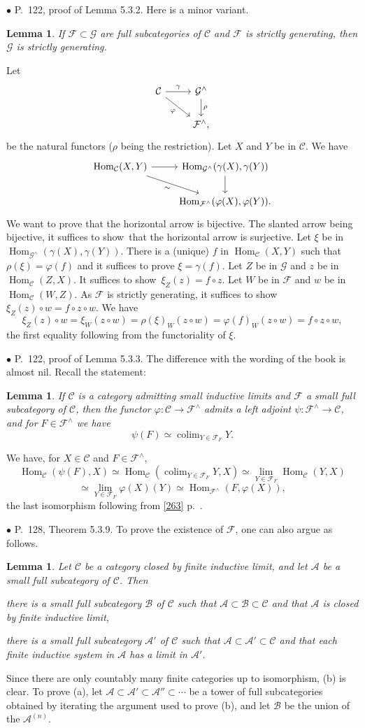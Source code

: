 \documentclass[12pt]{article}
\newtheorem{lem}[thm]{Lemma}
\theoremstyle{remark}%
\newcommand{\bu}{\bullet}
\newcommand{\n}{\noindent}
\newcommand{\A}{\mathcal A}
\newcommand{\B}{\mathcal B}
\newcommand{\C}{\mathcal C}
\newcommand{\F}{\mathcal F}
\newcommand{\G}{\mathcal G}
\newcommand{\p}{\varphi}
\newcommand{\pf}{\n{\em Proof. }}
\newcommand{\bl}{\begin{lem}}
\newcommand{\el}{\end{lem}}
\newcommand{\sts}{t suffices to show}
\DeclareMathOperator*{\co}{colim}
\DeclareMathOperator{\h}{Hom}
\begin{document}

\n$\bu$ P.~122, proof of Lemma 5.3.2. Here is a minor variant. 
%
\bl 
If $\F\subset\G$ are full subcategories of $\C$ and $\F$ is strictly generating, then $\G$ is strictly generating. 
\el 
%
\pf Let 
$$
\begin{tikzcd}
\C\ar{r}{\gamma}\ar{dr}[swap]{\p}&\G^\wedge\ar{d}{\rho}\\
&\F^\wedge,
\end{tikzcd}
$$ 
be the natural functors ($\rho$ being the restriction). Let $X$ and $Y$ be in $\C$. We have 
$$
\begin{tikzcd}
\h_\C(X,Y)\ar{r}\ar{dr}[swap]{\sim}&\h_{\G^\wedge}(\gamma(X),\gamma(Y))\ar{d}\\
&\h_{\F^\wedge}(\p(X),\p(Y)). 
\end{tikzcd}
$$ 
We want to prove that the horizontal arrow is bijective. The slanted arrow being bijective, i\sts\ that the horizontal arrow is surjective. Let $\xi$ be in $\h_{\G^\wedge}(\gamma(X),\gamma(Y))$. There is a (unique) $f$ in $\h_\C(X,Y)$ such that $\rho(\xi)=\p(f)$ and it suffices to prove $\xi=\gamma(f)$. Let $Z$ be in $\G$ and $z$ be in $\h_\C(Z,X)$. I\sts\ $\xi_Z(z)=f\circ z$. Let $W$ be in $\F$ and $w$ be in $\h_\C(W,Z)$. As $\F$ is strictly generating, i\sts\ $\xi_Z(z)\circ w=f\circ z\circ w$. We have 
$$
\xi_Z(z)\circ w=\xi_W(z\circ w)=\rho(\xi)_W(z\circ w)=\p(f)_W(z\circ w)
=f\circ z\circ w, 
$$ 
the first equality following from the functoriality of $\xi$. 


\n$\bu$ P.~122, proof of Lemma 5.3.3. The difference with the wording of the book is almost nil. Recall the statement: 
% 
\bl
If $\C$ is a category admitting small inductive limits and $\F$ a small full subcategory of $\C$, then the functor $\p:\C\to\F^\wedge$ admits a left adjoint $\psi:\F^\wedge\to\C$, and for $F\in\F^\wedge$ we have 
$$
\psi(F)\simeq\co_{Y\in\F_F}Y. 
$$ 
\el 
% 
\pf We have, for $X\in\C$ and $F\in\F^\wedge$, 
$$
\h_\C(\psi(F),X)\simeq\h_\C\left(\co_{Y\in\F_F}Y,X\right)\simeq\lim_{Y\in\F_F}\h_\C(Y,X)
$$ 
$$
\simeq\lim_{Y\in\F_F}\p(X)(Y)\simeq\h_{\F^\wedge}(F,\p(X)),
$$ 
the last isomorphism following from \eqref{263} p.~\pageref{263}. 


\n$\bu$ P.~128, Theorem 5.3.9. To prove the existence of $\F$, one can also argue as follows. 
% 
\begin{lem} 
% 
Let $\C$ be a category closed by finite inductive limit, and let $\A$ be a small full subcategory of $\C$. Then 

\n{\em(a)} there is a small full subcategory $\B$ of $\C$ such that $\A\subset\B\subset \C$ and that $\A$ is closed by finite inductive limit, 

\n{\em(b)} there is a small full subcategory $\A'$ of $\C$ such that $\A\subset\A'\subset \C$ and that each finite inductive system in $\A$ has a limit in $\A'$. 
%
\end{lem} 
% 
\n{\em Proof.} Since there are only countably many finite categories up to isomorphism, (b) is clear. To prove (a), let $\A\subset\A'\subset\A''\subset\cdots$ be a tower of full subcategories obtained by iterating the argument used to prove (b), and let $\B$ be the union of the $\A^{(n)}$. 
\end{document}
